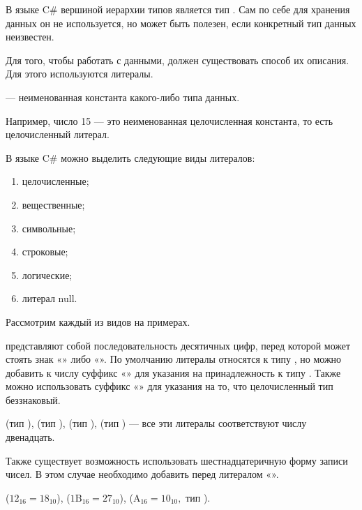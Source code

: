 В языке C\# вершиной иерархии типов является тип .  Сам
по себе для хранения данных он не используется, но может быть полезен,
если конкретный тип данных неизвестен. %

Для того, чтобы работать с данными, должен существовать способ их
описания. Для этого используются литералы.

\begin{defn}
   — неименованная константа какого-либо типа
  данных.
\end{defn}

Например, число 15 — это неименованная целочисленная константа, то
есть целочисленный литерал.

В языке C\# можно выделить следующие виды литералов:
\begin{enumerate}
\item целочисленные;
\item вещественные;
\item символьные;
\item строковые;
\item логические;
\item литерал null.
\end{enumerate}

Рассмотрим каждый из видов на примерах.

 представляют
собой последовательность десятичных цифр, перед которой может стоять
знак «\Lst{+}» либо «\Lst{-}». По умолчанию литералы относятся к
типу , но можно добавить к числу суффикс «» для
указания на принадлежность к типу . Также можно
использовать суффикс «» для указания на то, что
целочисленный тип беззнаковый. %

\begin{example}
   (тип ),  (тип ),
   (тип ),  (тип )
  — все эти литералы соответствуют числу двенадцать.
\end{example}

Также существует возможность использовать шестнадцатеричную форму
записи чисел. В этом случае необходимо добавить перед литералом
«».

\begin{example}
   ($12_{16}=18_{10}$), 
  ($\mathrm{1B}_{16}=27_{10}$), 
  ($\mathrm{A}_{16}=10_{10},$ тип ).
\end{example}

